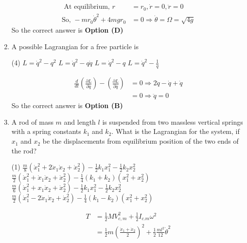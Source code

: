\begin{enumerate}
\begin{answer}
\begin{align*}
	\text{	At equilibrium, }r&=r_{0}, \dot{r}=0, \ddot{r}=0\\
	\text{So, }-m r_{0} \dot{\theta}^{2}+4 m g r_{0}&=0 \Rightarrow \dot{\theta}=\Omega=\sqrt{4 g}
	\end{align*}
	So the correct answer is \textbf{Option (D)}
\end{answer}
	\item A possible Lagrangian for a free particle is
	{}
	\begin{tasks}(4)
		\task[\textbf{A.}] $L=\dot{q}^{2}-q^{2}$
		\task[\textbf{B.}] $L=\dot{q}^{2}-q \dot{q}$
		\task[\textbf{C.}] $L=\dot{q}^{2}-q$
		\task[\textbf{D.}] $L=\dot{q}^{2}-\frac{1}{q}$
	\end{tasks}
\begin{answer}
	\begin{align*}
	\frac{d}{d t}\left(\frac{\partial L}{\partial \dot{q}}\right)-\left(\frac{\partial L}{\partial q}\right)&=0 \Rightarrow 2 \ddot{q}-\dot{q}+\dot{q}\\&=0 \Rightarrow \ddot{q}=0
	\end{align*}
	So the correct answer is \textbf{Option (B)}
\end{answer}
	\item  A rod of mass $m$ and length $l$ is suspended from two massless vertical springs with a spring constants $k_{1}$ and $k_{2} .$ What is the Lagrangian for the system, if $x_{1}$ and $x_{2}$ be the displacements from equilibrium position of the two ends of the rod?
	{}
	\begin{tasks}(1)
		\task[\textbf{A.}] $\frac{m}{8}\left(\dot{x}_{1}^{2}+2 \dot{x}_{1} \dot{x}_{2}+\dot{x}_{2}^{2}\right)-\frac{1}{2} k_{1} x_{1}^{2}-\frac{1}{2} k_{2} x_{2}^{2}$
		\task[\textbf{B.}] $\frac{m}{2}\left(\dot{x}_{1}^{2}+\dot{x}_{1} \dot{x}_{2}+\dot{x}_{2}^{2}\right)-\frac{1}{4}\left(k_{1}+k_{2}\right)\left(x_{1}^{2}+x_{2}^{2}\right)$
		\task[\textbf{C.}] $\frac{m}{6}\left(\dot{x}_{1}^{2}+x_{1} \dot{x}_{2}+\dot{x}_{2}^{2}\right)-\frac{1}{2} k_{1} x_{1}^{2}-\frac{1}{2} k_{2} x_{2}^{2}$
		\task[\textbf{D.}] $\frac{m}{2}\left(\dot{x}_{1}^{2}-2 \dot{x}_{1} \dot{x}_{2}+\dot{x}_{2}^{2}\right)-\frac{1}{4}\left(k_{1}-k_{2}\right)\left(x_{1}^{2}+x_{2}^{2}\right)$
	\end{tasks}
\begin{answer}
	\begin{align*}
	T&=\frac{1}{2} M V_{c, m}^{2}+\frac{1}{2} I_{c . m} \omega^{2}\\&=\frac{1}{2} m\left(\frac{\dot{x}_{1}+\dot{x}_{2}}{2}\right)^{2}+\frac{1}{2} \frac{m l^{2}}{12} \dot{\theta}^{2}\\

\end{align*}
\end{answer}
\end{enumerate}
